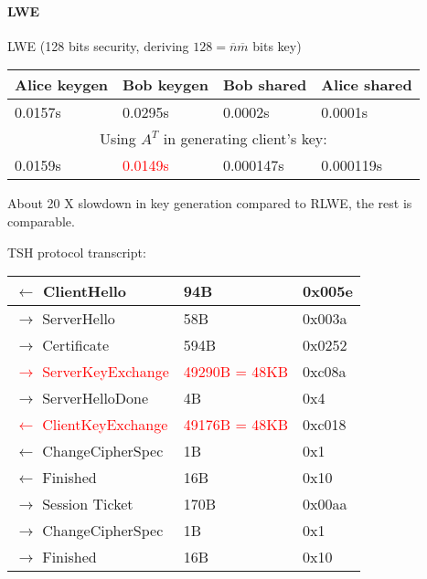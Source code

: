 \documentclass[12pt]{article}
\newcommand{\nbar}{\overline{n}}
\newcommand{\mbar}{\overline{m}}
\begin{document}
\paragraph{LWE}
LWE (128 bits security, deriving $128 = \nbar \mbar$ bits key)
\begin{center}
    \begin{tabular}{| l | l | l | l |}
    \hline
    Alice keygen & Bob keygen & Bob shared & Alice shared \\ \hline
    0.0157s & 0.0295s & 0.0002s & 0.0001s \\ \hline
    \multicolumn{4}{c}{Using $A^T$ in generating client's key:} \\ \hline
    0.0159s &   \textcolor{red}{0.0149s} &   0.000147s &   0.000119s \\ \hline
    \end{tabular}
\end{center}
About 20 X slowdown in key generation compared to RLWE, the rest is comparable.

TSH protocol transcript:
\begin{center}
    \begin{tabular}{| l | l | l |}
    \hline
    $\leftarrow$ ClientHello & 94B & 0x005e\\ \hline
    $\rightarrow$ ServerHello & 58B & 0x003a\\ \hline
    $\rightarrow$ Certificate & 594B & 0x0252\\ \hline
    \textcolor{red}{$\rightarrow$ ServerKeyExchange} & \textcolor{red}{49290B = 48KB} & 0xc08a\\ \hline
    $\rightarrow$ ServerHelloDone & 4B & 0x4\\ \hline
    \textcolor{red}{$\leftarrow$ ClientKeyExchange} & \textcolor{red}{49176B = 48KB} & 0xc018\\ \hline
    $\leftarrow$ ChangeCipherSpec & 1B & 0x1\\ \hline
    $\leftarrow$ Finished & 16B & 0x10\\ \hline
    $\rightarrow$ Session Ticket & 170B & 0x00aa\\ \hline
    $\rightarrow$ ChangeCipherSpec & 1B & 0x1\\ \hline
    $\rightarrow$ Finished & 16B & 0x10\\ \hline
    \end{tabular}
\end{center}
\end{document}
